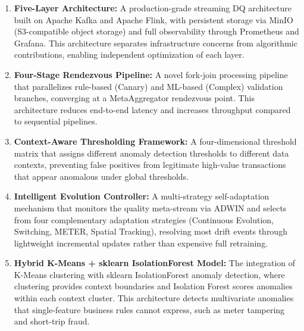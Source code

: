 \begin{enumerate}
    \item \textbf{Five-Layer Architecture:} A production-grade streaming DQ architecture built on Apache Kafka and Apache Flink, with persistent storage via MinIO (S3-compatible object storage) and full observability through Prometheus and Grafana. This architecture separates infrastructure concerns from algorithmic contributions, enabling independent optimization of each layer.

    \item \textbf{Four-Stage Rendezvous Pipeline:} A novel fork-join processing pipeline that parallelizes rule-based (Canary) and ML-based (Complex) validation branches, converging at a MetaAggregator rendezvous point. This architecture reduces end-to-end latency and increases throughput compared to sequential pipelines.

    \item \textbf{Context-Aware Thresholding Framework:} A four-dimensional threshold matrix that assigns different anomaly detection thresholds to different data contexts, preventing false positives from legitimate high-value transactions that appear anomalous under global thresholds.

    \item \textbf{Intelligent Evolution Controller:} A multi-strategy self-adaptation mechanism that monitors the quality meta-stream via ADWIN and selects from four complementary adaptation strategies (Continuous Evolution, Switching, METER, Spatial Tracking), resolving most drift events through lightweight incremental updates rather than expensive full retraining.

    \item \textbf{Hybrid K-Means + sklearn IsolationForest Model:} The integration of K-Means clustering with sklearn IsolationForest anomaly detection, where clustering provides context boundaries and Isolation Forest scores anomalies within each context cluster. This architecture detects multivariate anomalies that single-feature business rules cannot express, such as meter tampering and short-trip fraud.
\end{enumerate}

